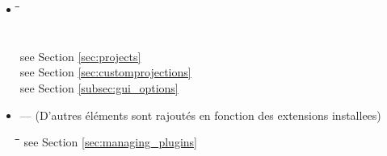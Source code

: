 \begin{itemize}
\item {}
\begin{tabbing}
\hspace{4.5cm}\=\hspace{3cm}\=\hspace{3.5cm}\= \kill
{}  
 \>           
 \>           
 \\
 \>           
 \>           
 \\
 \>
 \>           
 \\
 \> 
 \>           
 see Section \ref{sec:projects}
 \\
\> \>           
see Section \ref{sec:customprojections}
 \\
\> \>           
see Section \ref{subsec:gui_options}
 \\
\end{tabbing}

\item {} — (D'autres éléments sont rajoutés en fonction des extensions installees)
\begin{tabbing}
\hspace{4.5cm}\=\hspace{3cm}\=\hspace{3.5cm}\= \kill
{}              
\> \>           
see Section \ref{sec:managing_plugins}
 \\
\end{tabbing}    


%
%
%


\end{itemize}
